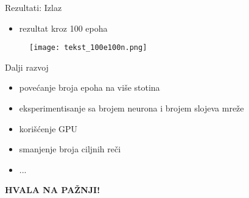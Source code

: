 \documentclass[table]{beamer}
\begin{document}
\begin{frame}{Rezultati: Izlaz}
\begin{itemize}
    \item rezultat kroz 100 epoha
\end{itemize}
\begin{figure}
    \centering
    \texttt{[image: tekst\_100e100n.png]}
\end{figure}
    
\end{frame}

\begin{frame}{Dalji razvoj}
    \begin{itemize}
        \item povećanje broja epoha na više stotina
        \item eksperimentisanje sa brojem neurona i brojem slojeva mreže
        \item korišćenje GPU
        \item smanjenje broja ciljnih reči
        \item ...
    \end{itemize}
\end{frame}

\begin{frame}
\centering
\Large
\textbf{\alert{HVALA NA PAŽNJI!}}

\end{frame}
\end{document}
